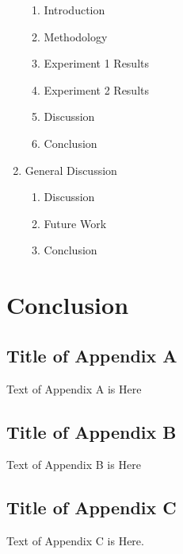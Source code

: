 \documentclass[10pt, letterpaper, twoside, openany]{book}
\begin{document}
\begin{enumerate}
	\begin{enumerate}
		\item Introduction
		\item Methodology
		\item Experiment 1 Results
		\item Experiment 2 Results
		\item Discussion
		\item Conclusion
	\end{enumerate}
	\item General Discussion
	\begin{enumerate}
		\item Discussion
		\item Future Work
		\item Conclusion
	\end{enumerate}
\end{enumerate}

\chapter{Conclusion}




\appendix
\section{Title of Appendix A}
Text of Appendix A is Here

\section{Title of Appendix B}
Text of Appendix B is Here

\section{Title of Appendix C}
Text of Appendix C is Here.
\end{document}
